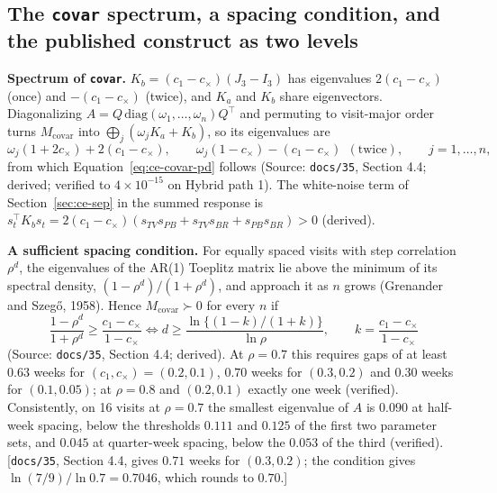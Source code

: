 \documentclass[11pt]{article}
\newcommand{\note}[1]{\textcolor{blue!60!black}{\small [#1]}}
\newcommand{\code}[1]{\texttt{#1}}
\begin{document}
\subsection{The \code{covar} spectrum, a spacing condition, and the
published construct as two levels}
\label{sec:inve-ce-covar}

\textbf{Spectrum of \code{covar}.} $K_b = (c_1 - c_\times)(J_3 - I_3)$
has eigenvalues $2(c_1-c_\times)$ (once) and $-(c_1-c_\times)$ (twice),
and $K_a$ and $K_b$ share eigenvectors. Diagonalizing
$A = Q\,\mathrm{diag}(\omega_1,\ldots,\omega_n)Q^\top$ and permuting to
visit-major order turns $M_{\mathrm{covar}}$ into
$\bigoplus_j(\omega_jK_a + K_b)$, so its eigenvalues are
\begin{equation}
\omega_j(1 + 2c_\times) + 2(c_1 - c_\times), \qquad
\omega_j(1 - c_\times) - (c_1 - c_\times)\ \ (\text{twice}),
\qquad j = 1, \ldots, n,
\label{eq:inve-covar-eig}
\end{equation}
from which Equation~\eqref{eq:ce-covar-pd} follows (Source:
\code{docs/35}, Section 4.4; derived; verified to $4\times10^{-15}$ on
Hybrid path 1). The white-noise term of Section~\ref{sec:ce-sep} in
the summed response is
$s_t^\top K_b s_t = 2(c_1-c_\times)(s_{TV}s_{PB} + s_{TV}s_{BR} +
s_{PB}s_{BR}) > 0$ (derived).

\textbf{A sufficient spacing condition.} For equally spaced visits with
step correlation $\rho^d$, the eigenvalues of the AR(1)
Toeplitz matrix lie above the minimum of its spectral density,
$(1-\rho^d)/(1+\rho^d)$, and approach it as $n$ grows (Grenander and
Szeg\H{o}, 1958). Hence $M_{\mathrm{covar}} \succ 0$ for every $n$ if
\begin{equation}
\frac{1 - \rho^d}{1 + \rho^d} \ge \frac{c_1 - c_\times}{1 - c_\times}
\iff
d \ge \frac{\ln\{(1-k)/(1+k)\}}{\ln\rho}, \qquad
k = \frac{c_1 - c_\times}{1 - c_\times}
\label{eq:inve-gap}
\end{equation}
(Source: \code{docs/35}, Section 4.4; derived). At $\rho = 0.7$ this
requires gaps of at least $0.63$ weeks for $(c_1, c_\times) =
(0.2, 0.1)$, $0.70$ weeks for $(0.3, 0.2)$ and $0.30$ weeks for
$(0.1, 0.05)$; at $\rho = 0.8$ and $(0.2, 0.1)$ exactly one week
(verified). Consistently, on 16 visits at $\rho = 0.7$ the smallest
eigenvalue of $A$ is $0.090$ at half-week spacing, below the thresholds
$0.111$ and $0.125$ of the first two parameter sets, and $0.045$ at
quarter-week spacing, below the $0.053$ of the third (verified).
\note{\code{docs/35}, Section 4.4, gives $0.71$ weeks for $(0.3, 0.2)$;
the condition gives $\ln(7/9)/\ln 0.7 = 0.7046$, which rounds to
$0.70$.}
\end{document}
